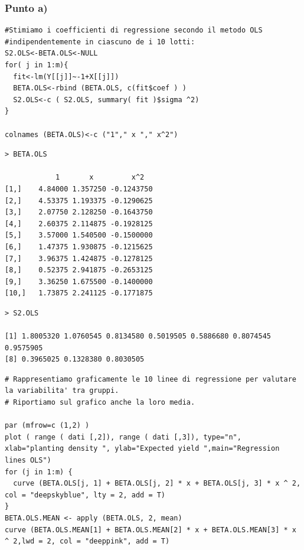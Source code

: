 \subsubsection*{Punto a)}
\begin{lstlisting}[style=R]
#Stimiamo i coefficienti di regressione secondo il metodo OLS
#indipendentemente in ciascuno de i 10 lotti:
S2.OLS<-BETA.OLS<-NULL
for( j in 1:m){
  fit<-lm(Y[[j]]~-1+X[[j]])
  BETA.OLS<-rbind (BETA.OLS, c(fit$coef ) )
  S2.OLS<-c ( S2.OLS, summary( fit )$sigma ^2)
}

colnames (BETA.OLS)<-c ("1"," x "," x^2")
\end{lstlisting}

{
\color{red}
\begin{Verbatim}
> BETA.OLS

            1       x         x^2
[1,]    4.84000 1.357250 -0.1243750
[2,]    4.53375 1.193375 -0.1290625
[3,]    2.07750 2.128250 -0.1643750
[4,]    2.60375 2.114875 -0.1928125
[5,]    3.57000 1.540500 -0.1500000
[6,]    1.47375 1.930875 -0.1215625
[7,]    3.96375 1.424875 -0.1278125
[8,]    0.52375 2.941875 -0.2653125
[9,]    3.36250 1.675500 -0.1400000
[10,]   1.73875 2.241125 -0.1771875
\end{Verbatim}
}

{
\color{red}
\begin{Verbatim}
> S2.OLS

[1] 1.8005320 1.0760545 0.8134580 0.5019505 0.5886680 0.8074545 0.9575905
[8] 0.3965025 0.1328380 0.8030505
\end{Verbatim}
}

\begin{lstlisting}[style=R]
# Rappresentiamo graficamente le 10 linee di regressione per valutare la variabilita' tra gruppi. 
# Riportiamo sul grafico anche la loro media.

par (mfrow=c (1,2) )
plot ( range ( dati [,2]), range ( dati [,3]), type="n", xlab="planting density ", ylab="Expected yield ",main="Regression lines OLS")
for (j in 1:m) {
  curve (BETA.OLS[j, 1] + BETA.OLS[j, 2] * x + BETA.OLS[j, 3] * x ^ 2, col = "deepskyblue", lty = 2, add = T)
}
BETA.OLS.MEAN <- apply (BETA.OLS, 2, mean)
curve (BETA.OLS.MEAN[1] + BETA.OLS.MEAN[2] * x + BETA.OLS.MEAN[3] * x ^ 2,lwd = 2, col = "deeppink", add = T)

\end{lstlisting}

